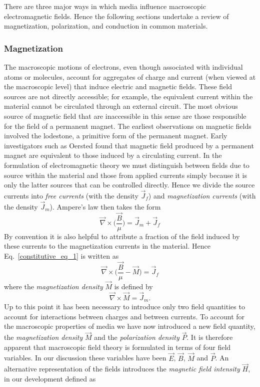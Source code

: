 \documentclass[12pt,a4paper,oneside]{book}
\begin{document}
\begin{onehalfspace}
There are three major ways in which media influence macroscopic electromagnetic fields. Hence the following sections undertake a review of magnetization, polarization, and conduction in common materials.
\subsubsection{Magnetization}
The macroscopic motions of electrons, even though associated with individual atoms or molecules, account for aggregates of charge and current (when viewed at the macroscopic level) that induce electric and magnetic fields. These field sources are not directly accessible; for example, the equivalent current within the material cannot be circulated through an external circuit. The most obvious source of magnetic field that are inaccessible in this sense are those responsible for the field of a permanent magnet. The earliest observations on magnetic fields involved the lodestone, a primitive form of the permanent magnet. Early investigators such as Oersted found that magnetic field produced by a permanent magnet are equivalent to those induced by a circulating current. In the formulation of electromagnetic theory we must distinguish between fields due to source within the material and those from applied currents simply because it is only the latter sources that can be controlled directly. Hence we divide the source currents into \textit{free currents} (with the density $\vec{J}_f$) and \textit{magnetization currents} (with the density $\vec{J}_m$). Ampere's law then takes the form
\begin{equation}\label{constitutive_eq_1}
	\vec{\nabla}\times\Big(\frac{\vec{B}}{\mu}\Big)= \vec{J}_m+\vec{J}_f
\end{equation}
By convention it is also helpful to attribute a fraction of the field induced by these currents to the magnetization currents in the material. Hence Eq.~\eqref{constitutive_eq_1} is written as
\begin{equation}\label{constitutive_eq_2}
	\vec{\nabla}\times\Big(\frac{\vec{B}}{\mu}-\vec{M}\Big)= \vec{J}_f
\end{equation}
where the \textit{magnetization density} $\vec{M}$ is defined by
\begin{equation}\label{constitutive_eq_3}
	\vec{\nabla}\times\vec{M}= \vec{J}_m.
\end{equation}
Up to this point it has been necessary to introduce only two field quantities to account for interactions between charges and between currents. To account for the macroscopic properties of media we have now introduced a new field quantity, the \textit{magnetization density} $\vec{M}$ and the \textit{polarization density} $\vec{P}$.  It is therefore apparent that macroscopic field theory is formulated in terms of four field variables. In our discussion these variables have been $\vec{E}$, $\vec{B}$, $\vec{M}$ and $\vec{P}$. An alternative representation of the fields introduces the \textit{magnetic field intensity} $\vec{H}$, in our development defined as 

\end{onehalfspace}
\end{document}

